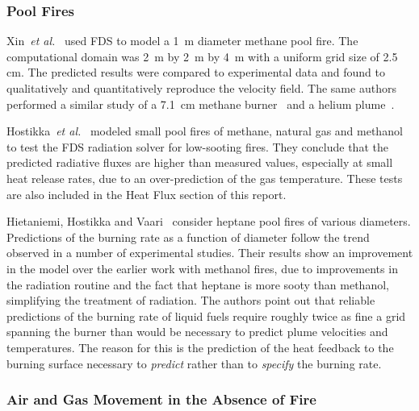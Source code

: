 \subsubsection{Pool Fires}


Xin~{\em et  al.}~\cite{Xin:JSS2005} used FDS to model  a 1~m diameter methane pool  fire.  The  computational domain was  2~m by 2~m  by 4~m with  a
uniform  grid  size of  2.5  cm.  The  predicted results  were compared  to   experimental  data  and  found   to  qualitatively  and quantitatively
reproduce   the  velocity  field.   The  same  authors performed a similar study of a 7.1~cm methane burner~\cite{Xin:CF2005} and a helium
plume~\cite{Xin:CS2002}.

Hostikka~{\em et al.}~\cite{Hostikka:3} modeled small pool fires of
methane, natural gas and methanol  to test the FDS radiation solver for low-sooting
fires.  They conclude that the predicted radiative fluxes are higher than measured values, especially at small heat
release rates, due to an over-prediction of the gas temperature. These
tests are also included in the Heat Flux section of this report.

Hietaniemi,  Hostikka and  Vaari~\cite{Hietaniemi:1}  consider heptane pool fires of various diameters.  Predictions of the burning rate as a
function  of  diameter  follow  the  trend observed  in  a  number  of experimental studies.  Their results show an improvement  in the model over
the earlier work with  methanol fires, due to improvements in the radiation  routine  and the  fact  that  heptane  is more  sooty  than methanol,
simplifying  the treatment of radiation.   The authors point out  that reliable  predictions of  the burning  rate of  liquid fuels require roughly
twice as fine a grid spanning the burner than would be necessary to predict plume velocities and temperatures. The reason for this is  the prediction
of the heat  feedback to the  burning surface necessary to {\em predict} rather  than to {\em specify} the burning rate.


\subsubsection{Air and Gas Movement in the Absence of Fire}

